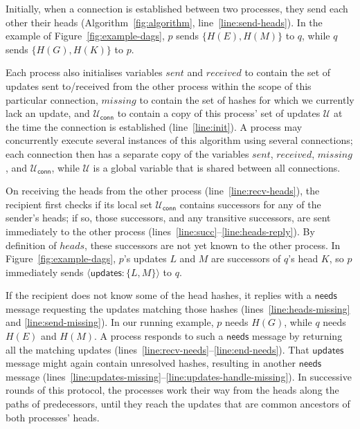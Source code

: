\documentclass[a4paper,anonymous,USenglish]{lipics-v2019}
\begin{document}
Initially, when a connection is established between two processes, they send each other their heads (Algorithm~\ref{fig:algorithm}, line~\ref{line:send-heads}).
In the example of Figure~\ref{fig:example-dags}, $p$ sends $\{H(E),H(M)\}$ to $q$, while $q$ sends $\{H(G),H(K)\}$ to $p$.

Each process also initialises variables $\mathit{sent}$ and $\mathit{received}$ to contain the set of updates sent to/received from the other process within the scope of this particular connection, $\mathit{missing}$ to contain the set of hashes for which we currently lack an update, and $\mathcal{U}_\mathsf{conn}$ to contain a copy of this process' set of updates $\mathcal{U}$ at the time the connection is established (line~\ref{line:init}).
A process may concurrently execute several instances of this algorithm using several connections; each connection then has a separate copy of the variables $\mathit{sent}$, $\mathit{received}$, $\mathit{missing}$, and $\mathcal{U}_\mathsf{conn}$, while $\mathcal{U}$ is a global variable that is shared between all connections.

On receiving the heads from the other process (line~\ref{line:recv-heads}), the recipient first checks if its local set $\mathcal{U}_\mathsf{conn}$ contains successors for any of the sender's heads; if so, those successors, and any transitive successors, are sent immediately to the other process (lines~\ref{line:succ}--\ref{line:heads-reply}).
By definition of $\mathit{heads}$, these successors are not yet known to the other process.
In Figure~\ref{fig:example-dags}, $p$'s updates $L$ and $M$ are successors of $q$'s head $K$, so $p$ immediately sends $\langle\mathsf{updates}: \{L, M\}\rangle$ to $q$.

If the recipient does not know some of the head hashes, it replies with a $\mathsf{needs}$ message requesting the updates matching those hashes (lines~\ref{line:heads-missing} and \ref{line:send-missing}).
In our running example, $p$ needs $H(G)$, while $q$ needs $H(E)$ and $H(M)$.
A process responds to such a $\mathsf{needs}$ message by returning all the matching updates (lines~\ref{line:recv-needs}--\ref{line:end-needs}).
That $\mathsf{updates}$ message might again contain unresolved hashes, resulting in another $\mathsf{needs}$ message (lines~\ref{line:updates-missing}--\ref{line:updates-handle-missing}).
In successive rounds of this protocol, the processes work their way from the heads along the paths of predecessors, until they reach the updates that are common ancestors of both processes' heads.
\end{document}
